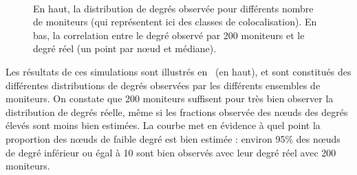 \begin{figure}[!ht]\centering
{}\\
\caption[Distributions observées dans les simulations de validation]{En haut, la
distribution de degrés observée pour différents nombre de moniteurs (qui
représentent ici des classes de colocalisation). En bas, la correlation entre le
degré observé par 200 moniteurs et le degré réel (un point par n\oe{}ud et
médiane).}
\label{fig:udpping-validation-simuls}
\end{figure}

Les résultats de ces simulations sont illustrés
en~ (en haut), et sont constitués des
différentes distributions de degrés observées par les différents ensembles de moniteurs. On
constate que 200 moniteurs suffisent pour très bien observer la distribution de
degrés réelle, même si les fractions observée des n\oe{}uds des degrés élevés sont
moins bien estimées. La courbe met en évidence à quel point la proportion des
n\oe{}uds de faible degré est bien estimée : environ 95\% des n\oe{}uds de degré
inférieur ou égal à 10 sont bien observés avec leur degré réel avec 200
moniteurs.

